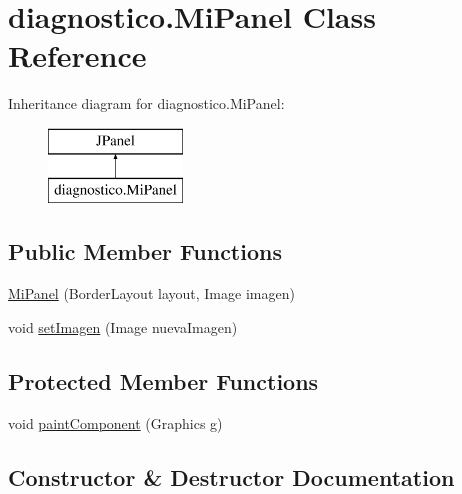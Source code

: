 \hypertarget{classdiagnostico_1_1_mi_panel}{}\section{diagnostico.\+Mi\+Panel Class Reference}
\label{classdiagnostico_1_1_mi_panel}
Inheritance diagram for diagnostico.\+Mi\+Panel\+:\begin{figure}[H]
\begin{center}
\leavevmode
\includegraphics[height=2.000000cm]{classdiagnostico_1_1_mi_panel}
\end{center}
\end{figure}
\subsection*{Public Member Functions}
\begin{DoxyCompactItemize}
\item 
\mbox{\hyperlink{classdiagnostico_1_1_mi_panel_a343b32d6734941ef1a50f86f8d87338a}{Mi\+Panel}} (Border\+Layout layout, Image imagen)
\item 
void \mbox{\hyperlink{classdiagnostico_1_1_mi_panel_a0e8e4fab59a54d7789953b6e2ac91fd2}{set\+Imagen}} (Image nueva\+Imagen)
\end{DoxyCompactItemize}
\subsection*{Protected Member Functions}
\begin{DoxyCompactItemize}
\item 
void \mbox{\hyperlink{classdiagnostico_1_1_mi_panel_a37804d70c95dbcfac404a975c6f73fb7}{paint\+Component}} (Graphics g)
\end{DoxyCompactItemize}


\subsection{Constructor \& Destructor Documentation}
\mbox{\label{classdiagnostico_1_1_mi_panel_a343b32d6734941ef1a50f86f8d87338a}} 
